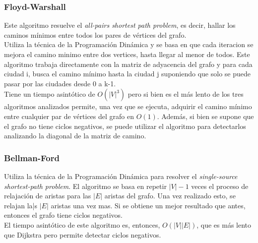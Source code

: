 \documentclass{article}
\newcommand\tab[1][0.5cm]{\hspace*{#1}}
\begin{document}
            \subsubsection{Floyd-Warshall}
            \tab Este algoritmo resuelve el \emph{all-pairs shortest path problem}, es decir, hallar los
            caminos mínimos entre todos los pares de vértices del grafo. \\
            \tab Utiliza la técnica de la Programación Dinámica y se basa en que cada iteracion se mejora
            el camino minimo entre dos vertices, hasta llegar al menor de todos. Este algoritmo trabaja
            directamente con la matriz de adyacencia del grafo y para cada ciudad i, busca el camino
            mínimo hasta la ciudad j suponiendo que solo se puede pasar por las ciudades desde 0 a k-1.\\ %
            \tab Tiene un tiempo asintótico de $O(|V|^3)$ pero si bien es el más lento de los tres
            algoritmos analizados permite, una vez que se ejecuta, adquirir el camino mínimo entre cualquier
            par de vértices del grafo en $O(1)$. Además, si bien se supone que el grafo no tiene ciclos negativos,
            se puede utilizar el algoritmo para detectarlos analizando la diagonal de la matriz de camino.

            \subsubsection{Bellman-Ford}
            \tab Utiliza la técnica de la Programación Dinámica para resolver el \emph{single-source shortest-path problem}.
            \tab El algoritmo se basa en repetir $|V| - 1$ veces el proceso de relajación de aristas para
            las $|E|$ aristas del grafo. Una vez realizado esto, se relajan la|s $|E|$ aristas una vez mas.
            Si se obtiene un mejor resultado que antes, entonces el grafo tiene ciclos negativos. \\
            \tab El tiempo asintótico de este algoritmo es, entonces, $O(|V||E|)$, que es más lento que Dijkstra
            pero permite detectar ciclos negativos.
\end{document}
